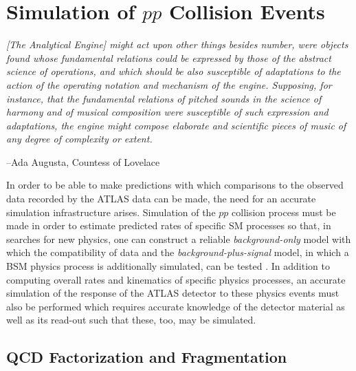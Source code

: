\chapter{Simulation of $pp$ Collision Events}
\label{chap:simulation}


\epigraph{\textit{[The Analytical Engine] might act upon other things besides number, were objects found whose
fundamental relations could be expressed by those of the abstract science of operations, and which should be also susceptible
of adaptations to the action of the operating notation and mechanism of the engine. Supposing, for instance, that the
fundamental relations of pitched sounds in the science of harmony and of musical composition were susceptible of such
expression and adaptations, the engine might compose elaborate and scientific pieces of music of any degree of
complexity or extent.}}{--Ada Augusta, Countess of Lovelace}

In order to be able to make predictions with which comparisons to the observed data
recorded by the ATLAS data can be made, the need for an accurate simulation infrastructure
arises.
Simulation of the $pp$ collision process must be made in order to estimate predicted
rates of specific SM processes so that, in searches for new physics, one can
construct a reliable \textit{background-only} model with which the compatibility of data
and the \textit{background-plus-signal} model, in which a BSM physics process is additionally simulated,
can be tested {\color{red}{NEEDS RE-WORDING}}.
In addition to computing overall rates and kinematics of specific physics processes, an accurate
simulation of the response of the ATLAS detector to these physics events must also be performed which
requires accurate knowledge of the detector material as well as its read-out such that these, too,
may be simulated.


\section{QCD Factorization and Fragmentation}
\label{sec:fact_frag}

